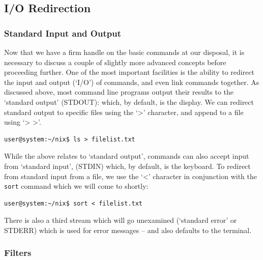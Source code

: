 \documentclass[11pt]{article}
\begin{document}
\subsection{I/O Redirection}
\subsubsection{Standard Input and Output}

Now that we have a firm handle on the basic commands at our disposal, it is necessary to discuss a couple of slightly more advanced concepts before proceeding further. One of the most important facilities is the ability to redirect the input and output (`I/O') of commands, and even link commands together. As discussed above, most command line programs output their results to the `standard output' (STDOUT): which, by default, is the display. We can redirect standard output to specific files using the `>' character, and append to a file using `> >'.\\

\begin{listing}[H]
\caption{>}\vspace{-0.1in}
\begin{verbatim}
user@system:~/nix$ ls > filelist.txt
\end{verbatim}
\end{listing}

While the above relates to `standard output', commands can also accept input from `standard input', (STDIN) which, by default, is the keyboard. To redirect from standard input from a file,  we use the `<' character in conjunction with the \texttt{sort} command which we will come to shortly: \\

\begin{listing}[H]
\caption{<}\vspace{-0.1in}
\begin{verbatim}
user@system:~/nix$ sort < filelist.txt
\end{verbatim}
\end{listing}

There is also a third stream which will go unexamined (`standard error' or STDERR) which is used for error messages -- and also defaults to the terminal.

\subsubsection{Filters}
\end{document}
